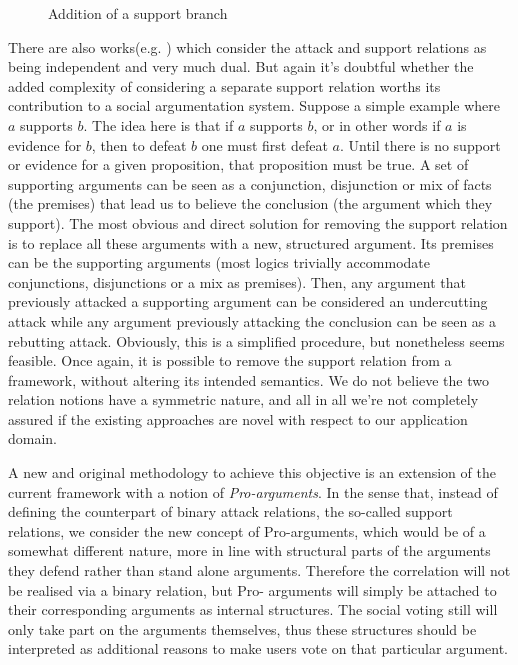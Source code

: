 \documentclass{article}
\begin{document}
{\begin{figure}[h!]
{
    \label{subfig:wsup}
  }
  
  \caption{Addition of  a support branch}
  \label{fig:oops}
\end{figure}

There are also works(e.g. \cite{4}) which consider the attack and support relations as being independent and very much dual. But again it's doubtful whether the added complexity of considering a separate support relation worths its contribution to a social argumentation system. Suppose a simple example where $a$ supports $b$. The idea here is that if $a$ supports $b$, or in other words if $a$ is evidence for $b$, then to defeat $b$ one must first defeat $a$. Until there is no support or evidence for a given proposition, that proposition must be true. A set of supporting arguments can be seen as a conjunction, disjunction or mix of facts (the premises) that lead us to believe the conclusion (the argument which they support). The most obvious and direct solution for removing the support relation is to replace all these arguments with a new, structured argument. Its premises can be the supporting arguments (most logics trivially accommodate conjunctions, disjunctions or a mix as premises). Then, any argument that previously attacked a supporting argument can be considered an undercutting attack while any argument previously attacking the conclusion can be seen as a rebutting attack. Obviously, this is a simplified procedure, but nonetheless seems feasible. Once again, it is possible to remove the support relation from a framework, without altering its intended semantics. We do not believe the two relation notions have a symmetric nature, and  all in all we're not completely assured if the existing approaches are novel with respect to our application domain. 

}



 {\color{red}A new and original methodology} to achieve this objective is an extension of the current framework with a notion of \emph{Pro-arguments}. In the sense that, instead of defining the counterpart of binary attack relations, the so-called support relations, we consider the new concept of Pro-arguments,  {\color{red}which would be of a somewhat different nature, more in line with structural parts of the arguments they defend rather than stand alone arguments. Therefore the correlation will not be realised via a binary relation, but Pro- arguments will simply be attached to their corresponding arguments as internal structures.} The social voting still will only take part on the arguments themselves, thus these structures should be interpreted as additional reasons to make users vote on that particular argument.
\end{document}
